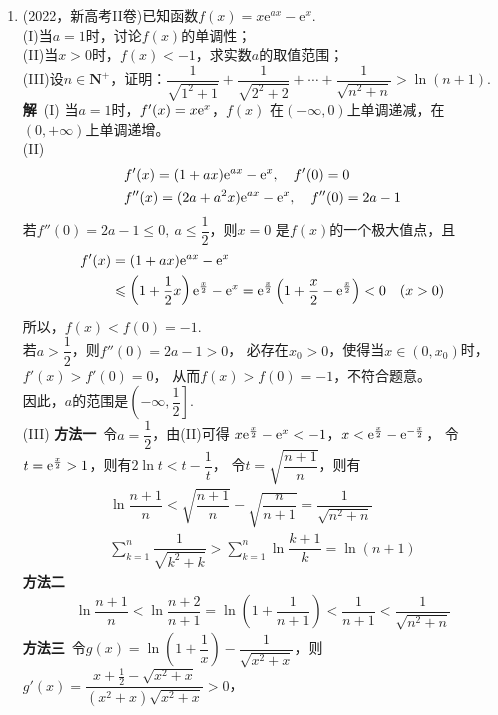 \begin{enumerate}[label={【\textbf{例\thechapter.\arabic*}】},
 leftmargin=\inteval{\myenumleftmargin}pt,
 itemsep=\inteval{\myenumitempsep}pt,
 itemindent=\inteval{\myenumitemindent}pt]
\item (2022，新高考II卷)已知函数$f(x)=x\mathrm{e}^{ax}-\mathrm{e}^{x}$. \\
(I)当$a=1$时，讨论$f(x)$的单调性；\\
(II)当$x>0$时，$f(x)<-1$，求实数$ a $的取值范围；\\
(III)设$n\in\mathbf{N}^+$，证明：$\dfrac{1}{\sqrt{1^{2}+1}}+
\dfrac{1}{\sqrt{2^{2}+2}}+\cdots+\dfrac{1}{\sqrt{n^{2}+n}}>\ln(n+1)$. \\
\textbf{解}\ (I) 当$a=1$时，$ f'(x)=x\mathrm{e}^x $，$ f(x) $
在$ (-\infty,0) $上单调递减，在$ (0,+\infty) $上单调递增。\\
(II) 
\begin{align*}
    & f'(x)=(1+ax)\mathrm{e}^{ax}-\mathrm{e}^x,\quad f'(0)=0 \\
    & f''(x)=(2a+a^2x)\mathrm{e}^{ax}-\mathrm{e}^x,\quad f''(0)=2a-1
\end{align*}
 若$ f''(0)=2a-1\leq 0,\ a\leq \dfrac{1}{2} $，则$ x=0 $
是$ f(x) $的一个极大值点，且
\begin{align*}
    f'(x) &=(1+ax)\mathrm{e}^{ax}-\mathrm{e}^x\\ &\leqslant \left(1+\dfrac{1}{2}x\right)
    \mathrm{e}^{\frac{x}{2}}-\mathrm{e}^x=\mathrm{e}^{\frac{x}{2}}\left(1+\dfrac{x}{2}-
    \mathrm{e}^{\frac{x}{2}}\right)<0 \quad (x>0)
\end{align*}
所以，$ f(x)<f(0)=-1 $. \\
 若$ a>\dfrac{1}{2} $，则$ f''(0)=2a-1>0 $，
必存在$ x_0>0 $，使得当$ x\in(0,x_0) $时，$ f'(x)>f'(0)=0 $，
从而$ f(x)>f(0)=-1 $，不符合题意。\\
因此，$ a $的范围是$ \left(-\infty,\dfrac{1}{2}\right] $. \\
(III) \textbf{方法一}\ 令$ a=\dfrac{1}{2} $，由(II)可得
$ x\mathrm{e}^{\frac{x}{2}}-\mathrm{e}^x<-1 $，$ x<\mathrm{e}^{\frac{x}{2}}-\mathrm{e}^{-\frac{x}{2}} $，
令$ t=\mathrm{e}^{\frac{x}{2}}>1 $，则有$ 2\ln t<t-\dfrac{1}{t} $，
令$ t=\sqrt{\dfrac{n+1}{n}} $，则有
\begin{gather*}
    \ln \dfrac{n+1}{n}<\sqrt{\dfrac{n+1}{n}}-\sqrt{\dfrac{n}{n+1}}
    =\dfrac{1}{\sqrt{n^2+n}} \\
    \sum_{k=1}^{n}\dfrac{1}{\sqrt{k^2+k}}>
    \sum_{k=1}^{n}\ln \dfrac{k+1}{k}=\ln(n+1)
\end{gather*}
\textbf{方法二}\ 
\begin{gather*}
    \ln \dfrac{n+1}{n}<\ln \dfrac{n+2}{n+1}=
    \ln\left(1+\dfrac{1}{n+1}\right)<\dfrac{1}{n+1}<
    \dfrac{1}{\sqrt{n^2+n}}  
\end{gather*}
\textbf{方法三}\ 令$ g(x)=\ln\left(1+\dfrac{1}{x}\right)-
\dfrac{1}{\sqrt{x^2+x}} $，则
$ g'(x)=\dfrac{x+\frac{1}{2}-\sqrt{x^2+x}}{(x^2+x)\sqrt{x^2+x}}>0 $，

\end{enumerate}
